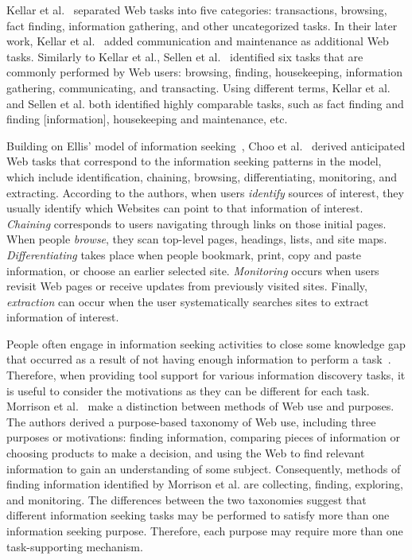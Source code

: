\documentclass{sigchi}
\begin{document}
Kellar et al.~\cite{kellar2006goal} separated Web tasks into five categories: transactions, browsing, fact finding, information gathering, and other uncategorized tasks. In their later work, Kellar et al.~\cite{kellar2007field} added communication and maintenance as additional Web tasks. Similarly to Kellar et al., Sellen et al.~\cite{sellen2002knowledge} identified six tasks that are commonly performed by Web users: browsing, finding, housekeeping, information gathering, communicating, and transacting. Using different terms, Kellar et al. and Sellen et al. both identified highly comparable tasks, such as fact finding and finding [information], housekeeping and maintenance, etc. 

Building on Ellis' model of information seeking~\cite{ellis1989behavioural,ellis1993comparison,ellis1997modelling}, Choo et al.~\cite{choo2000information} derived anticipated Web tasks that correspond to the information seeking patterns in the model, which include identification, chaining, browsing, differentiating, monitoring, and extracting.  According to the authors, when users \textit{identify} sources of interest, they usually identify which Websites can point to that information of interest.  \textit{Chaining} corresponds to users navigating through links on those initial pages. When people \textit{browse}, they scan top-level pages, headings, lists, and site maps. \textit{Differentiating} takes place when people bookmark, print, copy and paste information, or choose an earlier selected site. \textit{Monitoring} occurs when users revisit Web pages or receive updates from previously visited sites. Finally, \textit{extraction} can occur when the user systematically searches sites to extract information of interest.  

People often engage in information seeking activities to close some knowledge gap that occurred as a result of not having enough information to perform a task~\cite{proper1999information}. Therefore, when providing tool support for various information discovery tasks, it is useful to consider the motivations as they can be different for each task. Morrison et al.~\cite{morrison2001taxonomic} make a distinction between methods of Web use and purposes. The authors derived a purpose-based taxonomy of Web use, including three purposes or motivations: finding information, comparing pieces of information or choosing products to make a decision, and using the Web to find relevant information to gain an understanding of some subject. Consequently, methods of finding information identified by Morrison et al. are collecting, finding, exploring, and monitoring. The differences between the two taxonomies suggest that different information seeking tasks may be performed to satisfy more than one information seeking purpose. Therefore, each purpose may require more than one task-supporting mechanism. 
\end{document}

